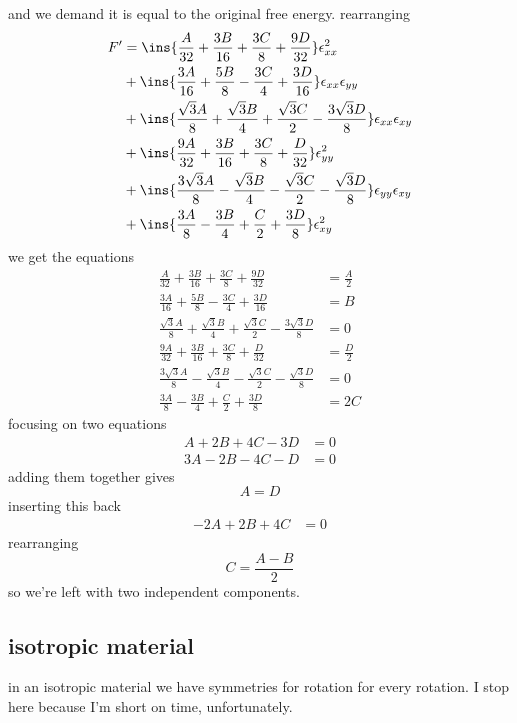 and we demand it is equal to the original free energy. rearranging 
\begin{align}
    F' &= \ins{\frac{A}{32}+\frac{3B}{16}+\frac{3C}{8}+\frac{9D}{32}}\epsilon_{xx}^2\\
    &+\ins{\frac{3A}{16}+\frac{5B}{8}-\frac{3C}{4}+\frac{3D}{16}}\epsilon_{xx}\epsilon_{yy}\\
    &+\ins{\frac{\sqrt{3}A}{8}+\frac{\sqrt{3}B}{4}+\frac{\sqrt{3}C}{2}-\frac{3\sqrt{3}D}{8}}\epsilon_{xx}\epsilon_{xy}\\
    &+\ins{\frac{9A}{32}+\frac{3B}{16}+\frac{3C}{8}+\frac{D}{32}}\epsilon_{yy}^2\\
    &+\ins{\frac{3\sqrt{3}A}{8}-\frac{\sqrt{3}B}{4}-\frac{\sqrt{3}C}{2}-\frac{\sqrt{3}D}{8}}\epsilon_{yy}\epsilon_{xy}\\
    &+\ins{\frac{3A}{8}-\frac{3B}{4}+\frac{C}{2}+\frac{3D}{8}}\epsilon_{xy}^2
\end{align}
we get the equations 
\begin{align}
    \frac{A}{32}+\frac{3B}{16}+\frac{3C}{8}+\frac{9D}{32} &= \frac{A}{2}\\
    \frac{3A}{16}+\frac{5B}{8}-\frac{3C}{4}+\frac{3D}{16} &= B\\
    \frac{\sqrt{3}A}{8}+\frac{\sqrt{3}B}{4}+\frac{\sqrt{3}C}{2}-\frac{3\sqrt{3}D}{8} &= 0\\
    \frac{9A}{32}+\frac{3B}{16}+\frac{3C}{8}+\frac{D}{32} &= \frac{D}{2}\\
    \frac{3\sqrt{3}A}{8}-\frac{\sqrt{3}B}{4}-\frac{\sqrt{3}C}{2}-\frac{\sqrt{3}D}{8} &= 0\\
    \frac{3A}{8}-\frac{3B}{4}+\frac{C}{2}+\frac{3D}{8} &= 2C
\end{align}
focusing on two equations 
\begin{align}
    A+2B+4C-3D &= 0\\
    3A-2B-4C-D &= 0
\end{align}
adding them together gives 
\begin{equation}
    A=D
\end{equation}
inserting this back 
\begin{align}
    -2A+2B+4C &= 0
\end{align}
rearranging 
\begin{equation}
    C = \frac{A-B}{2}
\end{equation}
so we're left with two independent components.
\subsection{isotropic material}
in an isotropic material we have symmetries for rotation for every rotation. I stop here because I'm short on time, unfortunately.